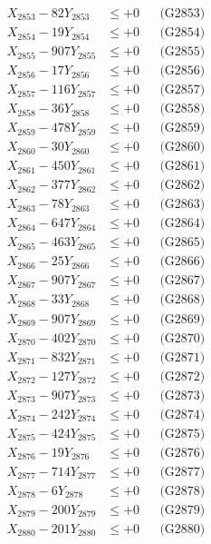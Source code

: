 \documentclass[a4paper,10pt]{article}
\begin{document}
{\begin{align}
X_{2853} - 82Y_{2853} &\leq +0 && \text{(G2853)} \\
X_{2854} - 19Y_{2854} &\leq +0 && \text{(G2854)} \\
X_{2855} - 907Y_{2855} &\leq +0 && \text{(G2855)} \\
X_{2856} - 17Y_{2856} &\leq +0 && \text{(G2856)} \\
X_{2857} - 116Y_{2857} &\leq +0 && \text{(G2857)} \\
X_{2858} - 36Y_{2858} &\leq +0 && \text{(G2858)} \\
X_{2859} - 478Y_{2859} &\leq +0 && \text{(G2859)} \\
X_{2860} - 30Y_{2860} &\leq +0 && \text{(G2860)} \\
\allowbreak
X_{2861} - 450Y_{2861} &\leq +0 && \text{(G2861)} \\
X_{2862} - 377Y_{2862} &\leq +0 && \text{(G2862)} \\
X_{2863} - 78Y_{2863} &\leq +0 && \text{(G2863)} \\
X_{2864} - 647Y_{2864} &\leq +0 && \text{(G2864)} \\
X_{2865} - 463Y_{2865} &\leq +0 && \text{(G2865)} \\
X_{2866} - 25Y_{2866} &\leq +0 && \text{(G2866)} \\
X_{2867} - 907Y_{2867} &\leq +0 && \text{(G2867)} \\
X_{2868} - 33Y_{2868} &\leq +0 && \text{(G2868)} \\
X_{2869} - 907Y_{2869} &\leq +0 && \text{(G2869)} \\
X_{2870} - 402Y_{2870} &\leq +0 && \text{(G2870)} \\
\allowbreak
X_{2871} - 832Y_{2871} &\leq +0 && \text{(G2871)} \\
X_{2872} - 127Y_{2872} &\leq +0 && \text{(G2872)} \\
X_{2873} - 907Y_{2873} &\leq +0 && \text{(G2873)} \\
X_{2874} - 242Y_{2874} &\leq +0 && \text{(G2874)} \\
X_{2875} - 424Y_{2875} &\leq +0 && \text{(G2875)} \\
X_{2876} - 19Y_{2876} &\leq +0 && \text{(G2876)} \\
X_{2877} - 714Y_{2877} &\leq +0 && \text{(G2877)} \\
X_{2878} - 6Y_{2878} &\leq +0 && \text{(G2878)} \\
X_{2879} - 200Y_{2879} &\leq +0 && \text{(G2879)} \\
X_{2880} - 201Y_{2880} &\leq +0 && \text{(G2880)} \\

\end{align}}
\end{document}
